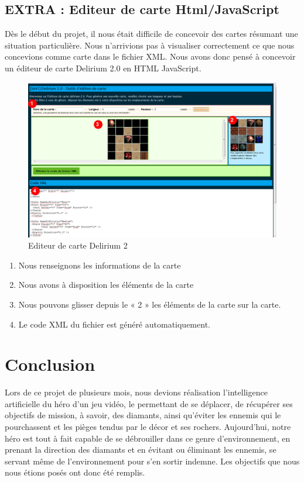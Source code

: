 \documentclass[a4paper,11pt]{article}
\begin{document}
	\subsection{EXTRA : Editeur de carte Html/JavaScript}
	
Dès le début du projet, il nous était difficile de concevoir des cartes résumant une situation particulière. Nous n’arrivions pas à visualiser correctement ce que nous concevions comme carte dans le fichier XML. Nous avons donc pensé à concevoir un éditeur de carte Delirium 2.0 en HTML \/ JavaScript.

	\begin{figure}[h]
			\center
			\includegraphics[width=12cm]{editeur}
			\caption{\label{situation22} Editeur de carte Delirium 2 }
		\end{figure}
		
	\begin{enumerate}
		\item Nous renseignons les informations de la carte
		\item Nous avons à disposition les éléments de la carte
		\item Nous pouvons glisser depuis le « 2 » les éléments de la carte sur la carte.
		\item Le code XML du fichier est généré automatiquement.
	\end{enumerate}
	
	\newpage
	\section{Conclusion}
	
Lors de ce projet de plusieurs mois, nous devions réalisation l’intelligence artificielle du héro d’un jeu vidéo, le permettant de se déplacer, de récupérer ses objectifs de mission, à savoir, des diamants, ainsi qu’éviter les ennemis qui le pourchassent et les pièges tendus par le décor et ses rochers. Aujourd’hui, notre héro est tout à fait capable de se débrouiller dans ce genre d’environnement, en prenant la direction des diamants et en évitant ou éliminant les ennemis, se servant même de l’environnement pour s’en sortir indemne. Les objectifs que nous nous étions posés ont donc été remplis.\\
\end{document}
